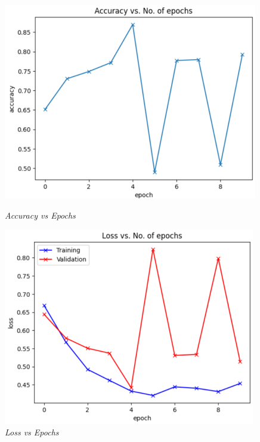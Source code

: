 \documentclass[12pt, a4paper]{report}
\begin{document}
\begin{figure}[htbp]
    \centering
    \begin{minipage}{0.3\textwidth}
        \centering
        \includegraphics[width=\linewidth]{report images/image27.png}
        \caption{\textit{Accuracy vs Epochs}}
    \end{minipage}%
    \hspace{0.03\textwidth} %
    \begin{minipage}{0.3\textwidth}
        \centering
        \includegraphics[width=\linewidth]{report images/image28.png}
        \caption{\textit{Loss vs Epochs}}
    \end{minipage}

\end{figure}
\end{document}

